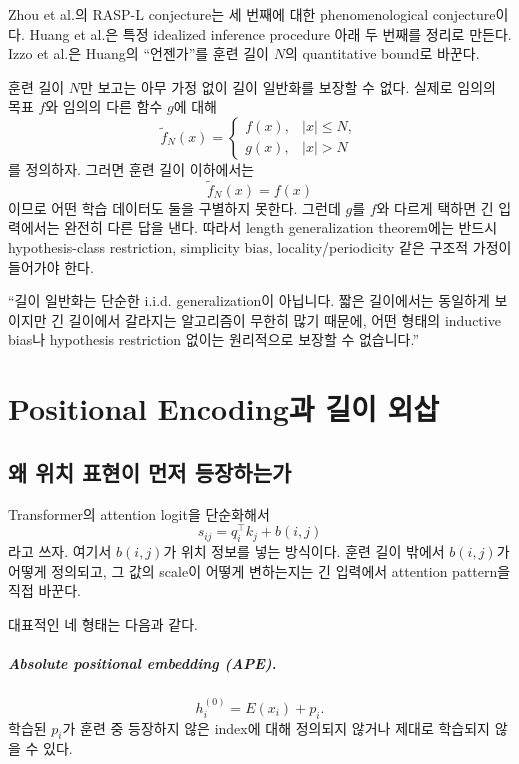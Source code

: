 \documentclass[11pt,a4paper,oneside,openany]{memoir}
\theoremstyle{definition}
\begin{document}
Zhou et al.의 RASP-L conjecture는 세 번째에 대한 phenomenological conjecture이다.
Huang et al.은 특정 idealized inference procedure 아래 두 번째를 정리로 만든다.
Izzo et al.은 Huang의 ``언젠가''를 훈련 길이 $N$의 quantitative bound로 바꾼다.

\begin{suppbox}
훈련 길이 $N$만 보고는 아무 가정 없이 길이 일반화를 보장할 수 없다.
실제로 임의의 목표 $f$와 임의의 다른 함수 $g$에 대해
\[
\widetilde f_N(x)=
\begin{cases}
f(x), & |x|\le N,\\
g(x), & |x|>N
\end{cases}
\]
를 정의하자. 그러면 훈련 길이 이하에서는
\[
\widetilde f_N(x)=f(x)
\]
이므로 어떤 학습 데이터도 둘을 구별하지 못한다. 그런데 $g$를 $f$와 다르게 택하면 긴 입력에서는 완전히 다른 답을 낸다.
따라서 length generalization theorem에는 반드시 hypothesis-class restriction, simplicity bias, locality/periodicity 같은 구조적 가정이 들어가야 한다.
\end{suppbox}

\begin{presentbox}
``길이 일반화는 단순한 i.i.d. generalization이 아닙니다. 짧은 길이에서는 동일하게 보이지만 긴 길이에서 갈라지는 알고리즘이 무한히 많기 때문에, 어떤 형태의 inductive bias나 hypothesis restriction 없이는 원리적으로 보장할 수 없습니다.''
\end{presentbox}

\chapter{Positional Encoding과 길이 외삽}

\section{왜 위치 표현이 먼저 등장하는가}

Transformer의 attention logit을 단순화해서
\[
s_{ij}=q_i^\top k_j+b(i,j)
\]
라고 쓰자. 여기서 $b(i,j)$가 위치 정보를 넣는 방식이다.
훈련 길이 밖에서 $b(i,j)$가 어떻게 정의되고, 그 값의 scale이 어떻게 변하는지는 긴 입력에서 attention pattern을 직접 바꾼다.

대표적인 네 형태는 다음과 같다.

\paragraph{Absolute positional embedding (APE).}
\[
h_i^{(0)}=E(x_i)+p_i.
\]
학습된 $p_i$가 훈련 중 등장하지 않은 index에 대해 정의되지 않거나 제대로 학습되지 않을 수 있다.
\end{document}
